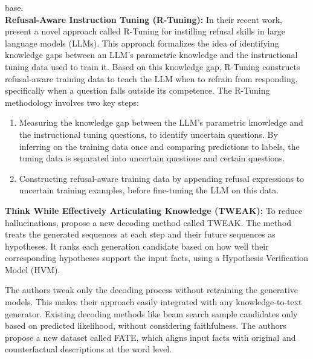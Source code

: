 \documentclass[11pt]{article}
\begin{document}
base. \\
\textbf{Refusal-Aware Instruction Tuning (R-Tuning):} In their recent work, ~\cite{zhang2023r} present a novel approach called R-Tuning for instilling refusal skills in large language models (LLMs). This approach formalizes the idea of identifying knowledge gaps between an LLM's parametric knowledge and the instructional tuning data used to train it. Based on this knowledge gap, R-Tuning constructs refusal-aware training data to teach the LLM when to refrain from responding, specifically when a question falls outside its competence.
The R-Tuning methodology involves two key steps:
\begin{enumerate}
    \item Measuring the knowledge gap between the LLM's parametric knowledge and the instructional tuning questions, to identify uncertain questions. By inferring on the training data once and comparing predictions to labels, the tuning data is separated into uncertain questions and certain questions. 
    \item Constructing refusal-aware training data by appending refusal expressions to uncertain training examples, before fine-tuning the LLM on this data.
\end{enumerate}
\textbf{Think While Effectively Articulating Knowledge (TWEAK):} To reduce hallucinations, \cite{qiu2023think} propose a new decoding method called TWEAK. The method treats the generated sequences at each step and their future sequences as hypotheses. It ranks each generation candidate based on how well their corresponding hypotheses support the input facts, using a Hypothesis Verification Model (HVM). 

The authors tweak only the decoding process without retraining the generative models. This makes their approach easily integrated with any knowledge-to-text generator. Existing decoding methods like beam search sample candidates only based on predicted likelihood, without considering faithfulness. The authors propose a new dataset called FATE, which aligns input facts with original and counterfactual descriptions at the word level.


\end{document}
